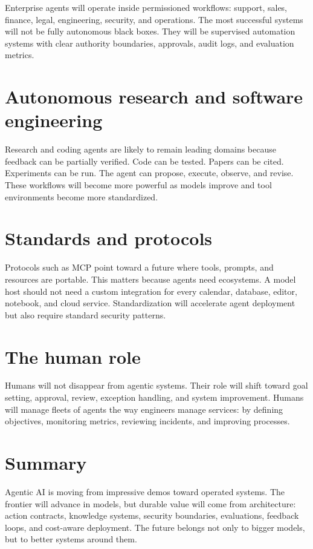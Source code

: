 Enterprise agents will operate inside permissioned workflows: support, sales, finance, legal, engineering, security, and operations. The most successful systems will not be fully autonomous black boxes. They will be supervised automation systems with clear authority boundaries, approvals, audit logs, and evaluation metrics.

\section{Autonomous research and software engineering}

Research and coding agents are likely to remain leading domains because feedback can be partially verified. Code can be tested. Papers can be cited. Experiments can be run. The agent can propose, execute, observe, and revise. These workflows will become more powerful as models improve and tool environments become more standardized.

\section{Standards and protocols}

Protocols such as MCP point toward a future where tools, prompts, and resources are portable. This matters because agents need ecosystems. A model host should not need a custom integration for every calendar, database, editor, notebook, and cloud service. Standardization will accelerate agent deployment but also require standard security patterns.

\section{The human role}

Humans will not disappear from agentic systems. Their role will shift toward goal setting, approval, review, exception handling, and system improvement. Humans will manage fleets of agents the way engineers manage services: by defining objectives, monitoring metrics, reviewing incidents, and improving processes.

\section{Summary}

Agentic AI is moving from impressive demos toward operated systems. The frontier will advance in models, but durable value will come from architecture: action contracts, knowledge systems, security boundaries, evaluations, feedback loops, and cost-aware deployment. The future belongs not only to bigger models, but to better systems around them.
